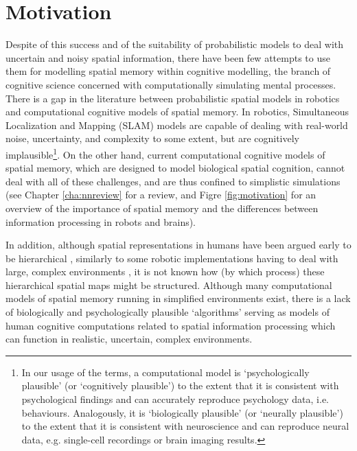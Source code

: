 \section{Motivation}
\label{sec:intro:motivation}

Despite of this success and of the suitability of probabilistic models to deal with uncertain and noisy spatial information, there have been few attempts to use them for modelling spatial memory within cognitive modelling, the branch of cognitive science concerned with computationally simulating mental processes. There is a gap in the literature between probabilistic spatial models in robotics and computational cognitive models of spatial memory. In robotics, Simultaneous Localization and Mapping (SLAM) models \citep{thrun2008simultaneous} are capable of dealing with real-world noise, uncertainty, and complexity to some extent, but are cognitively implausible\footnote{In our usage of the terms, a computational model is `psychologically plausible' (or `cognitively plausible') to the extent that it is consistent with psychological findings and can accurately reproduce psychology data, i.e. behaviours. Analogously, it is `biologically plausible' (or `neurally plausible') to the extent that it is consistent with neuroscience and can reproduce neural data, e.g. single-cell recordings or brain imaging results.}. On the other hand,  current computational cognitive models of spatial memory, which are designed to model biological spatial cognition,  cannot deal with all of these challenges, and are thus confined to simplistic simulations (see Chapter \ref{cha:nnreview} for a review, and Figre \ref{fig:motivation} for an overview of the importance of spatial memory and the differences between information processing in robots and brains). 


In addition, although spatial representations in humans have been argued early to be hierarchical \citep{hirtle1985evidence, mcnamara1989subjective, greenauer2010micro}, similarly to some robotic implementations having to deal with large, complex environments \citep{kuipers2000spatial, wurm2010octomap}, it is not known how (by which process) these hierarchical spatial maps might be structured. Although many computational models of spatial memory running in simplified environments exist, there is a lack of biologically and psychologically plausible `algorithms' serving as models of human cognitive computations related to spatial information processing which can function in realistic, uncertain, complex environments.

